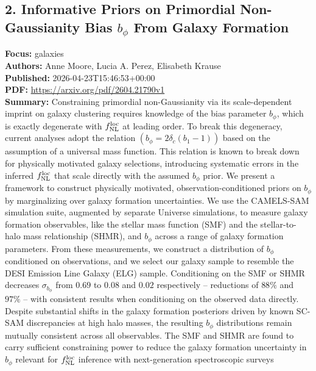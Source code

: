 \documentclass[11pt]{article}
\begin{document}
\subsection*{2. Informative Priors on Primordial Non-Gaussianity Bias $b_\phi $ From Galaxy Formation}
\textbf{Focus:} galaxies\\
\textbf{Authors:} Anne Moore, Lucia A. Perez, Elisabeth Krause\\
\textbf{Published:} 2026-04-23T15:46:53+00:00\\
\textbf{PDF:} \href{https://arxiv.org/pdf/2604.21790v1}{https://arxiv.org/pdf/2604.21790v1}\\
\textbf{Summary:}
Constraining primordial non-Gaussianity via its scale-dependent imprint on galaxy clustering requires knowledge of the bias parameter $b_\phi $, which is exactly degenerate with $f^{\rm{loc}}_{\rm{NL}}$ at leading order. To break this degeneracy, current analyses adopt the relation $\left(b_\phi  = 2\delta _c\left(b_1 - 1\right)\right)$ based on the assumption of a universal mass function. This relation is known to break down for physically motivated galaxy selections, introducing systematic errors in the inferred $f^{\rm{loc}}_{\rm{NL}}$ that scale directly with the assumed $b_\phi $ prior. We present a framework to construct physically motivated, observation-conditioned priors on $b_\phi $ by marginalizing over galaxy formation uncertainties. We use the CAMELS-SAM simulation suite, augmented by separate Universe simulations, to measure galaxy formation observables, like the stellar mass function (SMF) and the stellar-to-halo mass relationship (SHMR), and $b_\phi $ across a range of galaxy formation parameters. From these measurements, we construct a distribution of $b_\phi $ conditioned on observations, and we select our galaxy sample to resemble the DESI Emission Line Galaxy (ELG) sample. Conditioning on the SMF or SHMR decreases $\sigma _{b_\phi }$ from $0.69$ to $0.08$ and $0.02$ respectively -- reductions of $88\%$ and $97\%$ -- with consistent results when conditioning on the observed data directly. Despite substantial shifts in the galaxy formation posteriors driven by known SC-SAM discrepancies at high halo masses, the resulting $b_\phi $ distributions remain mutually consistent across all observables. The SMF and SHMR are found to carry sufficient constraining power to reduce the galaxy formation uncertainty in $b_\phi $ relevant for $f^{\rm{loc}}_{\rm{NL}}$ inference with next-generation spectroscopic surveys
\newpage
\end{document}
